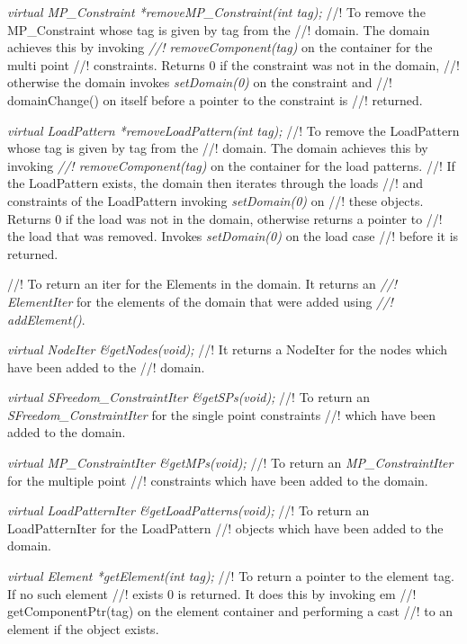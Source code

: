{\em virtual MP\_Constraint *removeMP\_Constraint(int tag);} 
//! To remove the MP\_Constraint whose tag is given by \p tag from the
//! domain. The domain achieves this by invoking {\em
//! removeComponent(tag)} on the container for the multi point
//! constraints. Returns $0$ if the constraint was not in the domain,
//! otherwise the domain invokes {\em setDomain(0)} on the constraint and
//! domainChange() on itself before a pointer to the constraint is
//! returned.   

{\em virtual LoadPattern *removeLoadPattern(int tag);}         
//! To remove the LoadPattern whose tag is given by \p tag from the
//! domain. The domain achieves this by invoking {\em
//! removeComponent(tag)} on the container for the load patterns. 
//! If the LoadPattern exists, the domain then iterates through the loads
//! and constraints of the LoadPattern invoking {\em setDomain(0)} on
//! these objects. Returns
$0$ if the load was not in the domain, otherwise returns a pointer to
//! the load that was removed. Invokes {\em setDomain(0)} on the load case
//! before it is returned. 


//! To return an iter for the Elements in the domain. It returns an {\em
//! ElementIter} for the elements of the domain that were added using {\em
//! addElement()}.   

{\em virtual NodeIter \&getNodes(void);} 
//! It returns a \p NodeIter for the nodes which have been added to the
//! domain.  

{\em virtual SFreedom\_ConstraintIter \&getSPs(void);} 
//! To return an {\em SFreedom\_ConstraintIter} for the single point constraints
//! which have been added to the domain.  

{\em virtual MP\_ConstraintIter \&getMPs(void);} 
//! To return an {\em MP\_ConstraintIter} for the multiple point
//! constraints which have been added to the domain.  

{\em virtual LoadPatternIter \&getLoadPatterns(void);} 
//! To return an \p LoadPatternIter for the LoadPattern
//! objects which have been added to the domain.  

{\em virtual  Element *getElement(int tag);}
//! To return a pointer to the element \p tag. If no such element
//! exists $0$ is returned. It does this by invoking {em
//! getComponentPtr(tag)} on the element container and performing a cast
//! to an element if the object exists. 

